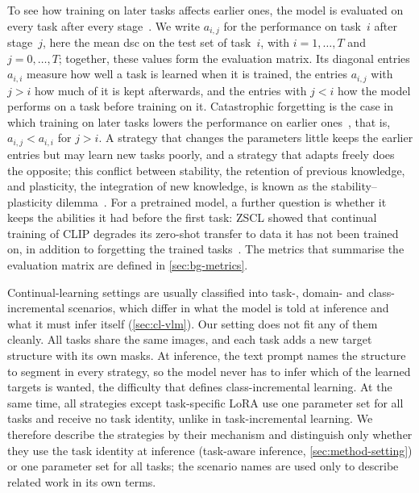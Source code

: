 To see how training on later tasks affects earlier ones, the model is evaluated on every task after every stage~\cite[Fig.~4b]{zheng2023preventingzeroshottransferdegradation}.
We write $a_{i,j}$ for the performance on task~$i$ after stage~$j$, here the mean \gls{dsc} on the test set of task~$i$, with $i = 1, \dots, T$ and $j = 0, \dots, T$; together, these values form the evaluation matrix.
Its diagonal entries $a_{i,i}$ measure how well a task is learned when it is trained, the entries $a_{i,j}$ with $j > i$ how much of it is kept afterwards, and the entries with $j < i$ how the model performs on a task before training on it.
Catastrophic forgetting is the case in which training on later tasks lowers the performance on earlier ones~\cite{french1999catastrophic}, that is, $a_{i,j} < a_{i,i}$ for $j > i$.
A strategy that changes the parameters little keeps the earlier entries but may learn new tasks poorly, and a strategy that adapts freely does the opposite; this conflict between stability, the retention of previous knowledge, and plasticity, the integration of new knowledge, is known as the stability--plasticity dilemma~\cite[Sec.~1]{delange2022}.
For a pretrained model, a further question is whether it keeps the abilities it had before the first task: ZSCL showed that continual training of CLIP degrades its zero-shot transfer to data it has not been trained on, in addition to forgetting the trained tasks~\cite[Sec.~1]{zheng2023preventingzeroshottransferdegradation}.
The metrics that summarise the evaluation matrix are defined in \cref{sec:bg-metrics}.

Continual-learning settings are usually classified into task-, domain- and class-incremental scenarios, which differ in what the model is told at inference and what it must infer itself (\cref{sec:cl-vlm}).
Our setting does not fit any of them cleanly.
All tasks share the same images, and each task adds a new target structure with its own masks.
At inference, the text prompt names the structure to segment in every strategy, so the model never has to infer which of the learned targets is wanted, the difficulty that defines class-incremental learning.
At the same time, all strategies except task-specific LoRA use one parameter set for all tasks and receive no task identity, unlike in task-incremental learning.
We therefore describe the strategies by their mechanism and distinguish only whether they use the task identity at inference (task-aware inference, \cref{sec:method-setting}) or one parameter set for all tasks; the scenario names are used only to describe related work in its own terms.

